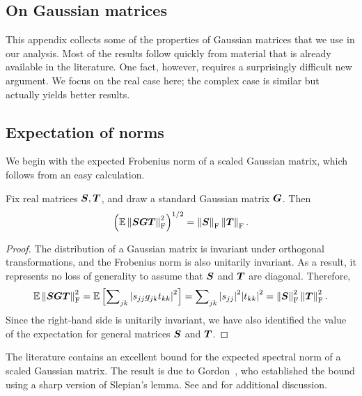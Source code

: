 \documentclass[final]{siamltex}
\newcommand{\notate}[1]{\textcolor{red}{\textbf{[#1]}}}
\begin{document}
\begin{appendix}


\section{On Gaussian matrices} \label{app:gauss}
This appendix collects some of the properties of Gaussian matrices that we use in our analysis.
Most of the results follow quickly from material that is already available in the literature.
One fact, however, requires a surprisingly difficult new argument.  We focus on the
real case here; the complex case is similar but actually yields better results.

\subsection{Expectation of norms}

We begin with the expected Frobenius norm of a scaled Gaussian matrix,
which follows from an easy calculation.

\lsp

\begin{proposition} \label{prop:gauss-frob-expect}
Fix real matrices $\bm{S}, \bm{T}$, and draw a standard Gaussian matrix $\bm{G}$.  Then
$$
\left( \operatorname{\mathbb{E}} \left\Vert { \bm{SGT} } \right\Vert_{\mathrm{F}}^2 \right)^{1/2}
    = \left\Vert {\bm{S}} \right\Vert_{\mathrm{F}} \left\Vert {\bm{T}} \right\Vert_{\mathrm{F}}.
$$
\end{proposition}


\begin{proof}
The distribution of a Gaussian matrix is invariant
under orthogonal transformations, and the Frobenius norm is also
unitarily invariant.  As a result, it represents no loss of
generality to assume that $\bm{S}$ and $\bm{T}$ are diagonal.
Therefore,
$$
\operatorname{\mathbb{E}} \left\Vert { \bm{SGT} } \right\Vert_{\mathrm{F}}^2
    = \operatorname{\mathbb{E}} \left[ \sum\nolimits_{jk} {\left\vert {s_{jj} g_{jk} t_{kk}} \right\vert}^2 \right]
    = \sum\nolimits_{jk} {\left\vert {s_{jj}} \right\vert}^2 {\left\vert {t_{kk}} \right\vert}^2
    = \left\Vert { \bm{S} } \right\Vert_{\mathrm{F}}^2 \left\Vert {\bm{T} } \right\Vert_{\mathrm{F}}^2.
$$
Since the right-hand side is unitarily invariant, we have also
identified the value of the expectation for general matrices
$\bm{S}$ and $\bm{T}$.
\end{proof}

\lsp


The literature
contains an excellent bound for the expected spectral norm of a scaled Gaussian matrix.
The result is due to Gordon~\cite{Gor85:Some-Inequalities,Gor88:Gaussian-Processes},
who established the bound using a sharp version of Slepian's lemma.
See \cite[\S3.3]{LT91:Probability-Banach} and
\cite[\S2.3]{DS02:Local-Operator} for additional discussion.


\end{appendix}
\end{document}
